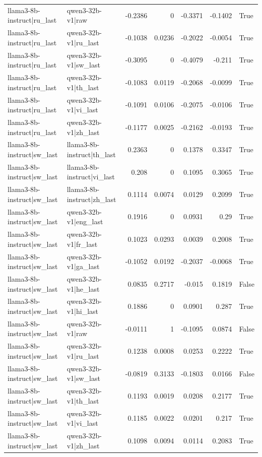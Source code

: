 \begin{table}
\begin{tabular}{l l r r r r l}
llama3-8b-instruct|ru_last & qwen3-32b-v1|raw & -0.2386 & 0 & -0.3371 & -0.1402 & True \\
llama3-8b-instruct|ru_last & qwen3-32b-v1|ru_last & -0.1038 & 0.0236 & -0.2022 & -0.0054 & True \\
llama3-8b-instruct|ru_last & qwen3-32b-v1|sw_last & -0.3095 & 0 & -0.4079 & -0.211 & True \\
llama3-8b-instruct|ru_last & qwen3-32b-v1|th_last & -0.1083 & 0.0119 & -0.2068 & -0.0099 & True \\
llama3-8b-instruct|ru_last & qwen3-32b-v1|vi_last & -0.1091 & 0.0106 & -0.2075 & -0.0106 & True \\
llama3-8b-instruct|ru_last & qwen3-32b-v1|zh_last & -0.1177 & 0.0025 & -0.2162 & -0.0193 & True \\
llama3-8b-instruct|sw_last & llama3-8b-instruct|th_last & 0.2363 & 0 & 0.1378 & 0.3347 & True \\
llama3-8b-instruct|sw_last & llama3-8b-instruct|vi_last & 0.208 & 0 & 0.1095 & 0.3065 & True \\
llama3-8b-instruct|sw_last & llama3-8b-instruct|zh_last & 0.1114 & 0.0074 & 0.0129 & 0.2099 & True \\
llama3-8b-instruct|sw_last & qwen3-32b-v1|eng_last & 0.1916 & 0 & 0.0931 & 0.29 & True \\
llama3-8b-instruct|sw_last & qwen3-32b-v1|fr_last & 0.1023 & 0.0293 & 0.0039 & 0.2008 & True \\
llama3-8b-instruct|sw_last & qwen3-32b-v1|ga_last & -0.1052 & 0.0192 & -0.2037 & -0.0068 & True \\
llama3-8b-instruct|sw_last & qwen3-32b-v1|he_last & 0.0835 & 0.2717 & -0.015 & 0.1819 & False \\
llama3-8b-instruct|sw_last & qwen3-32b-v1|hi_last & 0.1886 & 0 & 0.0901 & 0.287 & True \\
llama3-8b-instruct|sw_last & qwen3-32b-v1|raw & -0.0111 & 1 & -0.1095 & 0.0874 & False \\
llama3-8b-instruct|sw_last & qwen3-32b-v1|ru_last & 0.1238 & 0.0008 & 0.0253 & 0.2222 & True \\
llama3-8b-instruct|sw_last & qwen3-32b-v1|sw_last & -0.0819 & 0.3133 & -0.1803 & 0.0166 & False \\
llama3-8b-instruct|sw_last & qwen3-32b-v1|th_last & 0.1193 & 0.0019 & 0.0208 & 0.2177 & True \\
llama3-8b-instruct|sw_last & qwen3-32b-v1|vi_last & 0.1185 & 0.0022 & 0.0201 & 0.217 & True \\
llama3-8b-instruct|sw_last & qwen3-32b-v1|zh_last & 0.1098 & 0.0094 & 0.0114 & 0.2083 & True \\

\end{tabular}
\end{table}
